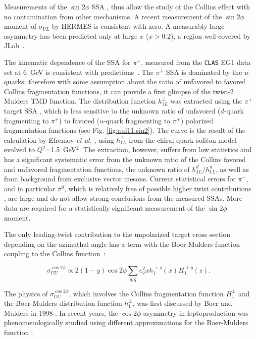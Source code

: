 Measurements of the $\sin2\phi$ SSA \cite{Kotzinian:1995cz}, thus allow the 
study of the Collins effect with no contamination from other mechanisms.  A 
recent measurement of the $\sin 2\phi$ moment of $\sigma_{UL}$ by HERMES 
\cite{Airapetian:1999tv} is consistent with zero.  A measurably large 
asymmetry has been predicted only at large $x$ ($x>0.2$), a region 
well-covered by JLab~\cite{Efremov:2002ut}. 

The kinematic dependence of the SSA for $\pi^+$, measured from the {\tt CLAS} 
EG1 data set at 6~GeV is consistent with predictions~\cite{Efremov:2002ut}. 
The $\pi^+$ SSA is dominated by the $u$-quarks; therefore with some assumption 
about the ratio of unfavored to favored Collins fragmentation functions, it can 
provide a first glimpse of the twist-2 Mulders TMD function.  The distribution 
function $h_{1L}^\perp$ was extracted using the $\pi^+$ target SSA 
\cite{Avakian:2005ps}, which is less sensitive to the unknown ratio of 
unfavored ($d$-quark fragmenting to $\pi^+$) to favored ($u$-quark fragmenting 
to $\pi^+$) polarized fragmentation functions (see Fig. \ref{fig:aul11.sin2}). 
The curve is the result of the calculation by Efremov {\it et al.} 
\cite{Efremov:2002ut}, using $h_{1L}^\perp$ from the chiral quark soliton 
model evolved to $Q^2$=1.5~GeV$^2$.  The extraction, however, suffers from low 
statistics and has a significant systematic error from the unknown ratio of 
the Collins favored and unfavored fragmentation functions, the unknown ratio 
of $h_{1L}^d/h_{1L}^u$, as well as from background from exclusive vector mesons.
Current statistical errors for $\pi^-$, and in particular $\pi^0$, which is 
relatively free of possible higher twist contributions \cite{Afanasev:1996mj},
are large and do not allow strong conclusions from the measured SSAs.  More 
data are required for a statistically significant measurement of the
$\sin2\phi$ moment.

The only leading-twist contribution to the unpolarized target cross section
depending on the azimuthal angle has a term with the Boer-Mulders function 
coupling to the Collins function~\cite{Collins:1992kk}:

\begin{equation}
\sigma^{\cos2\phi}_{UU} \propto 2(1-y)\cos 2\phi\sum_{q,\bar{q}} 
e^2_q {x h^{\perp q}_{1}(x)} {H_1^{\perp q}(z)}.
\end{equation}

The physics of $\sigma^{\cos2\phi}_{UU}$, which involves the Collins 
fragmentation function $H_1^\perp$ and the Boer-Mulders distribution function 
$h_{1}^\perp$, was first discussed by Boer and Mulders in 1998
\cite{Boer:1997nt}.  In recent years, the $\cos 2\phi$ asymmetry in 
leptoproduction was phenomenologically studied using different approximations 
for the Boer-Mulders function 
\cite{Oganesian:1997jq,Gamberg:2003ey,Barone:2005kt}.

